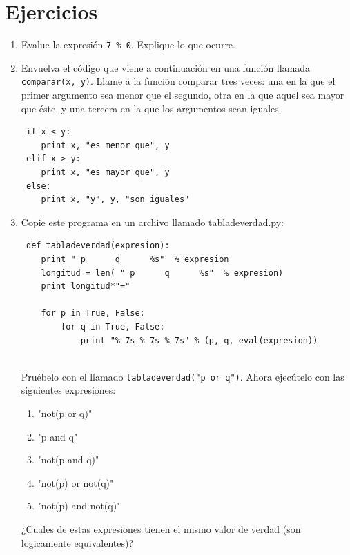 \section{Ejercicios}
\begin{enumerate}

 \item Evalue la expresión \verb+7 % 0+. Explique lo que ocurre.
 
 \item Envuelva el código que viene a continuación en una función llamada \verb+comparar(x, y)+. Llame a la función comparar tres veces: 
 una en la que el primer argumento sea menor que el segundo, otra en la que aquel sea mayor que éste, y 
 una tercera en la que los argumentos sean iguales.
 \begin{verbatim} 
 if x < y:
    print x, "es menor que", y
 elif x > y:
    print x, "es mayor que", y
 else:
    print x, "y", y, "son iguales"
 \end{verbatim}
 
 \item Copie este programa en un archivo llamado tabladeverdad.py:
 \begin{verbatim}
 def tabladeverdad(expresion):
    print " p      q      %s"  % expresion
    longitud = len( " p      q      %s"  % expresion)
    print longitud*"="

    for p in True, False:
        for q in True, False:
            print "%-7s %-7s %-7s" % (p, q, eval(expresion))
 
 \end{verbatim}
 Pruébelo con el llamado \verb+tabladeverdad("p or q")+. Ahora ejecútelo con las siguientes expresiones:
 \begin{enumerate}
 \item "not(p or q)"
 \item "p and q"
 \item "not(p and q)"
 \item "not(p) or not(q)"
 \item "not(p) and not(q)"
 \end{enumerate}
 
 ¿Cuales de estas expresiones tienen el mismo valor de verdad (son logicamente equivalentes)?
 
 
 
\end{enumerate}

